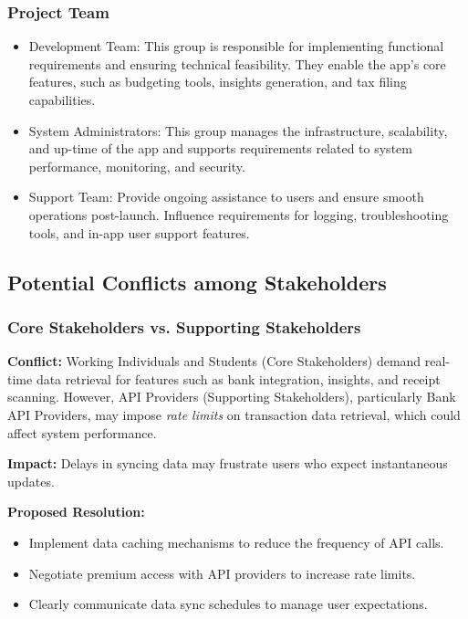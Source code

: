 \subsubsection{Project Team}
\begin{itemize}
    \item Development Team: This group is responsible for implementing functional requirements and ensuring technical feasibility. They enable the app's core features, such as budgeting tools, insights generation, and tax filing capabilities. 
    
    \item System Administrators: This group manages the infrastructure, scalability, and up-time of the app and supports requirements related to system performance, monitoring, and security.

    \item Support Team: Provide ongoing assistance to users and ensure smooth operations post-launch. Influence requirements for logging, troubleshooting tools, and in-app user support features.

\end{itemize}

\subsection{Potential Conflicts among Stakeholders}

\subsubsection{Core Stakeholders vs. Supporting Stakeholders}
\textbf{Conflict:} Working Individuals and Students (Core Stakeholders) demand real-time data retrieval for features such as bank integration, insights, and receipt scanning. However, API Providers (Supporting Stakeholders), particularly Bank API Providers, may impose \textit{rate limits} on transaction data retrieval, which could affect system performance.

\textbf{Impact:} Delays in syncing data may frustrate users who expect instantaneous updates.

\textbf{Proposed Resolution:}
\begin{itemize}
    \item Implement data caching mechanisms to reduce the frequency of API calls.
    \item Negotiate premium access with API providers to increase rate limits.
    \item Clearly communicate data sync schedules to manage user expectations.
\end{itemize}

